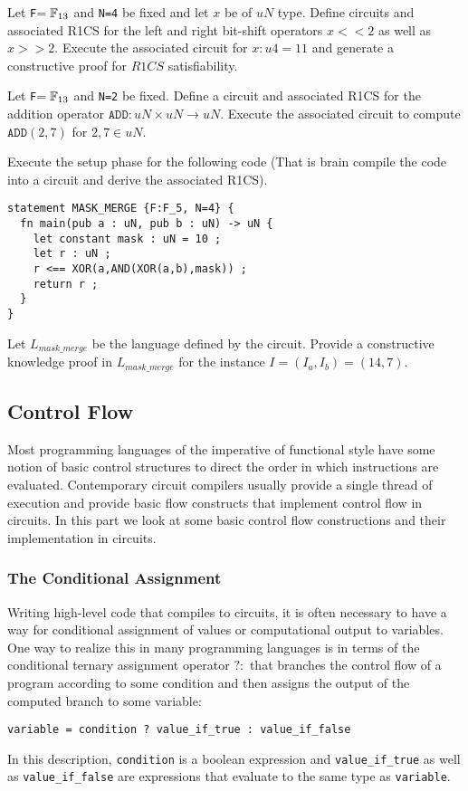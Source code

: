 \begin{exercise}
Let \texttt{F}$=\mathbb{F}_{13}$ and \texttt{N=4} be fixed and let $x$ be of $uN$ type. Define circuits and associated R1CS for the left and right bit-shift operators $x<<2$ as well as $x>>2$. Execute the associated circuit for $x : u4 = 11$ and generate a constructive proof for $R1CS$ satisfiability.
\end{exercise}
\begin{exercise}
Let \texttt{F}$=\mathbb{F}_{13}$ and \texttt{N=2} be fixed. Define a circuit and associated R1CS for the addition operator $\mathtt{ADD}: uN \times uN \to uN$. Execute the associated circuit to compute $\mathtt{ADD}(2,7)$ for $2,7\in uN$.
\end{exercise}
\begin{exercise} Execute the setup phase for the following  code (That is brain compile the code into a circuit and derive the associated R1CS). 
\begin{lstlisting}
statement MASK_MERGE {F:F_5, N=4} {
  fn main(pub a : uN, pub b : uN) -> uN {
    let constant mask : uN = 10 ;
    let r : uN ;
    r <== XOR(a,AND(XOR(a,b),mask)) ;
    return r ;
  }
}
\end{lstlisting}
Let $L_{mask\_merge}$ be the language defined by the circuit. Provide a constructive knowledge proof in $L_{mask\_merge}$ for the instance $I=(I_a, I_b) = (14, 7)$.
\end{exercise}
\subsection{Control Flow} Most programming languages of the imperative of functional style have some notion of basic control structures to direct the order in which instructions are evaluated. Contemporary circuit compilers usually provide a single thread of execution and provide basic flow constructs that implement control flow in circuits. In this part we look at some basic control flow constructions and their implementation in circuits.
\subsubsection{The Conditional Assignment} Writing high-level code that compiles to circuits, it is often necessary to have a way for conditional assignment of values or computational output to variables. One way to realize this in many programming languages is in terms of the conditional ternary assignment operator $?:$ that branches the control flow of a program according to some condition and then assigns the output of the computed branch to some variable: 
\begin{lstlisting}
variable = condition ? value_if_true : value_if_false  
\end{lstlisting}
In this description, \texttt{condition} is a boolean expression and \texttt{value\_if\_true} as well as \texttt{value\_if\_false} are expressions that evaluate to the same type as \texttt{variable}.

